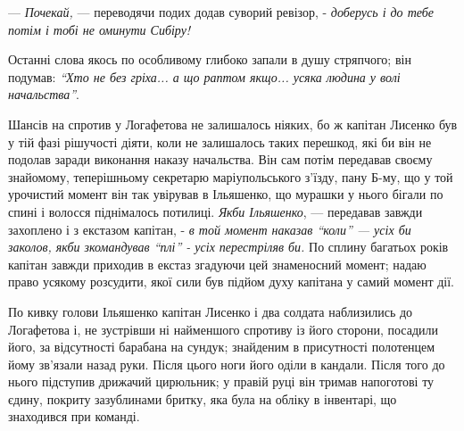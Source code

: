 \documentclass[a4paper,20pt]{report}
\begin{document}
— \emph{Почекай,} — переводячи подих додав суворий ревізор, - \emph{доберусь і до тебе потім і тобі
не оминути Сибіру!}

Останні слова якось по особливому глибоко запали в душу стряпчого; він подумав: \emph{``Хто не без гріха...
а що раптом якщо... усяка людина у волі начальства''}. 

Шансів на спротив у Логафетова не залишалось ніяких, бо ж капітан Лисенко був у тій фазі рішучості діяти,
коли не залишалось таких перешкод, які би він не подолав заради виконання наказу начальства. Він сам потім
передавав своєму знайомому, теперішньому секретарю маріупольського з'їзду, пану Б-му,
що у той урочистий момент він так увірував в Ільяшенко, що мурашки у нього бігали по спині і волосся піднімалось
потилиці.  \emph{Якби Ільяшенко}, — передавав завжди захоплено і з екстазом капітан, - 
\emph{в той момент наказав ``коли'' — усіх би заколов, якби зкомандував ``плі'' - усіх перестріляв би.}
По сплину багатьох років капітан завжди приходив в екстаз згадуючи цей 
знаменосний момент; надаю право усякому розсудити, якої сили був підйом духу
капітана у самий момент дії.


По кивку голови Ільяшенко капітан Лисенко і два солдата 
наблизились до Логафетова і, не зустрівши ні
найменшого спротиву із його сторони, посадили його, за відсутності барабана на сундук;
знайденим в присутності полотенцем йому зв'язали назад руки. Після цього ноги
його оділи в кандали. Після того до нього підступив дрижачий цирюльник; у правій руці
він тримав напоготові ту єдину, покриту зазублинами бритку, яка була на обліку
в інвентарі, що знаходився при команді.
\end{document}
